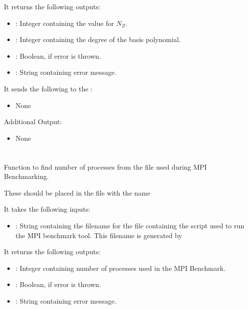 It returns the following outputs:

\begin{itemize}
\item {}: Integer containing the value for \(N_Z\).
\item {}: Integer containing the degree of the basis polynomial.
\item {}: Boolean,  if error is thrown.
\item {}: String containing error message.
\end{itemize}

It sends the following to the :

\begin{itemize}
\item None
\end{itemize}

Additional Output:
\begin{itemize}
\item None
\end{itemize}


\section{}
Function to find number of processes from the  file used during MPI Benchmarking.

These should be placed in the file  with the name 

It takes the following inputs:

\begin{itemize}
\item {}: String containing the filename for the  file containing the script used to run the MPI benchmark tool. This filename is generated by 
\end{itemize}

It returns the following outputs:

\begin{itemize}
\item {}: Integer containing number of processes used in the MPI Benchmark.
\item {}: Boolean,  if error is thrown.
\item {}: String containing error message.
\end{itemize}

